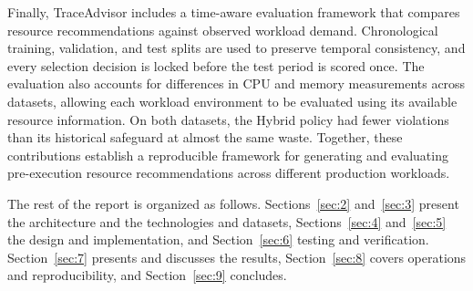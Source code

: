Finally, TraceAdvisor includes a time-aware evaluation framework that compares resource recommendations against observed workload demand. Chronological training, validation, and test splits are used to preserve temporal consistency, and every selection decision is locked before the test period is scored once. The evaluation also accounts for differences in CPU and memory measurements across datasets, allowing each workload environment to be evaluated using its available resource information. On both datasets, the Hybrid policy had fewer violations than its historical safeguard at almost the same waste. Together, these contributions establish a reproducible framework for generating and evaluating pre-execution resource recommendations across different production workloads.

The rest of the report is organized as follows. Sections~\ref{sec:2} and~\ref{sec:3} present the architecture and the technologies and datasets, Sections~\ref{sec:4} and~\ref{sec:5} the design and implementation, and Section~\ref{sec:6} testing and verification. Section~\ref{sec:7} presents and discusses the results, Section~\ref{sec:8} covers operations and reproducibility, and Section~\ref{sec:9} concludes.
